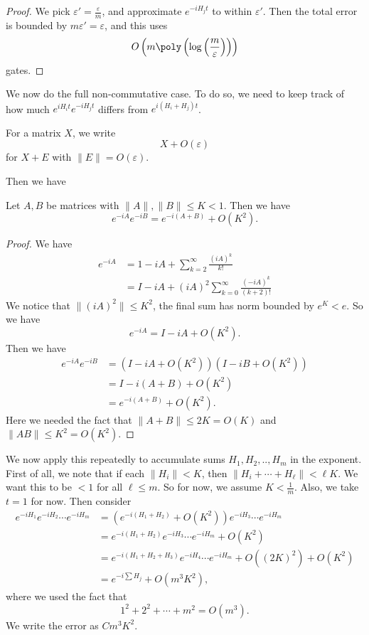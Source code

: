 \documentclass[a4paper]{article}
\begin{document}
\begin{proof}
  We pick $\varepsilon' = \frac{\varepsilon}{m}$, and approximate $e^{-iH_jt}$ to within $\varepsilon'$. Then the total error is bounded by $m\varepsilon' = \varepsilon$, and this uses
  \[
    O\left(m \poly\left(\log\left(\frac{m}{\varepsilon}\right)\right)\right)
  \]
  gates.
\end{proof}

We now do the full non-commutative case. To do so, we need to keep track of how much $e^{iH_i t} e^{-i H_j t}$ differs from $e^{i(H_i + H_j) t}$.

\begin{notation}
  For a matrix $X$, we write
  \[
    X + O (\varepsilon)
  \]
  for $X + E$ with $\|E\| = O(\varepsilon)$.
\end{notation}

Then we have
\begin{lemma}
  Let $A, B$ be matrices with $\|A\|, \|B\| \leq K < 1$. Then we have
  \[
    e^{-iA} e^{-iB} = e^{-i(A + B)} + O(K^2).
  \]
\end{lemma}

\begin{proof}
  We have
  \begin{align*}
    e^{-iA} &= 1 - iA + \sum_{k = 2}^\infty \frac{(iA)^k}{k!}\\
    &= I - iA + (iA)^2 \sum_{k = 0}^\infty \frac{(-iA)^k}{(k + 2)!}
  \end{align*}
  We notice that $\|(iA)^2\| \leq K^2$, the final sum has norm bounded by $e^K < e$. So we have
  \[
    e^{-iA} = I - iA + O(K^2).
  \]
  Then we have
  \begin{align*}
    e^{-iA} e^{-iB} &= (I - iA + O(K^2))(I - iB + O(K^2)) \\
    &= I - i(A + B) + O(K^2) \\
    &= e^{-i(A + B)} + O(K^2).
  \end{align*}
  Here we needed the fact that $\|A + B\| \leq 2K = O(K)$ and $\|AB\| \leq K^2 = O(K^2)$.
\end{proof}

We now apply this repeatedly to accumulate sums $H_1, H_2, .., H_m$ in the exponent. First of all, we note that if each $\|H_i\| < K$, then $\|H_i + \cdots + H_\ell\| < \ell K$. We want this to be $ < 1$ for all $\ell \leq m$. So for now, we assume $K < \frac{1}{m}$. Also, we take $t = 1$ for now. Then consider
\begin{align*}
  e^{-iH_1} e^{-iH_2} \cdots e^{-iH_m} &= (e^{-i(H_1 + H_2)} + O(K^2)) e^{-i H_3} \cdots e^{-iH_m}\\
  &= e^{-i(H_1 + H_2)} e^{-iH_3} \cdots e^{-i H_m} + O(K^2)\\
  &= e^{-i(H_1 + H_2 + H_3)} e^{-iH_4} \cdots e^{-iH_m} + O((2K)^2) + O(K^2)\\
  &= e^{-i\sum H_j} + O(m^3 K^2),
\end{align*}
where we used the fact that
\[
  1^2 + 2^2 + \cdots + m^2 = O(m^3).
\]
We write the error as $C m^3 K^2$.
\end{document}
